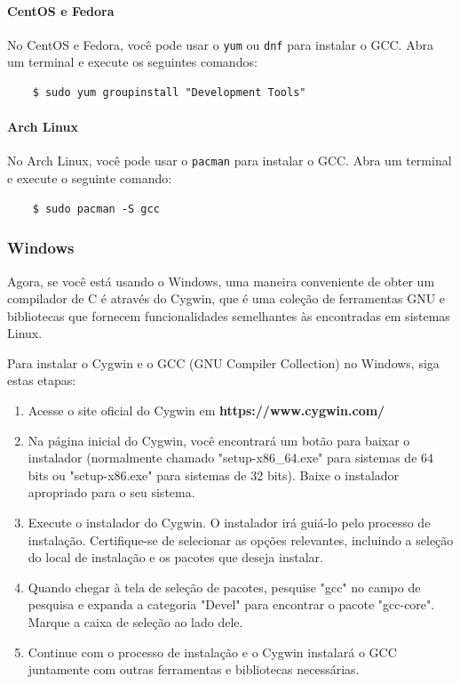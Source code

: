\paragraph{CentOS e Fedora}
No CentOS e Fedora, você pode usar o \texttt{yum} ou \texttt{dnf} para instalar o GCC. Abra um terminal e execute os seguintes comandos:
\begin{verbatim}
    $ sudo yum groupinstall "Development Tools"
\end{verbatim}

\paragraph{Arch Linux}
No Arch Linux, você pode usar o \texttt{pacman} para instalar o GCC. Abra um terminal e execute o seguinte comando:

\begin{verbatim}
    $ sudo pacman -S gcc
\end{verbatim}

\subsubsection{Windows}
Agora, se você está usando o Windows, uma maneira conveniente de obter um compilador de C é através do Cygwin, que é uma coleção de ferramentas GNU e bibliotecas que fornecem funcionalidades semelhantes às encontradas em sistemas Linux.

Para instalar o Cygwin e o GCC (GNU Compiler Collection) no Windows, siga estas etapas:

\begin{enumerate}
\item Acesse o site oficial do Cygwin em \textbf{https://www.cygwin.com/}

\item Na página inicial do Cygwin, você encontrará um botão para baixar o instalador (normalmente chamado "setup-x86\_64.exe" para sistemas de 64 bits ou "setup-x86.exe" para sistemas de 32 bits). Baixe o instalador apropriado para o seu sistema.

\item Execute o instalador do Cygwin. O instalador irá guiá-lo pelo processo de instalação. Certifique-se de selecionar as opções relevantes, incluindo a seleção do local de instalação e os pacotes que deseja instalar. 

\item Quando chegar à tela de seleção de pacotes, pesquise "gcc" no campo de pesquisa e expanda a categoria "Devel" para encontrar o pacote "gcc-core". Marque a caixa de seleção ao lado dele.

\item Continue com o processo de instalação e o Cygwin instalará o GCC juntamente com outras ferramentas e bibliotecas necessárias.
\end{enumerate}

